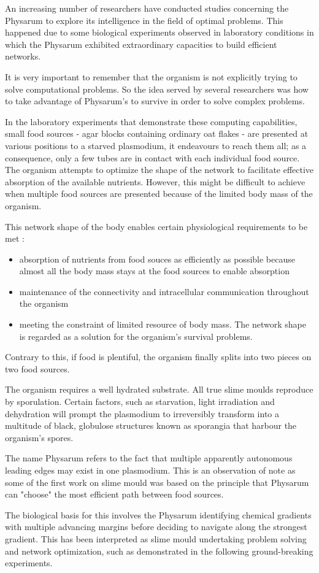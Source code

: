 
An increasing number of researchers have conducted studies concerning the Physarum to explore its intelligence in the field of optimal problems. This happened due to some biological experiments observed in laboratory conditions in which the Physarum exhibited extraordinary capacities to build efficient networks.
\par
It is very important to remember that the organism is not explicitly trying to solve computational problems. So the idea served by several researchers was how to take advantage of Physarum’s to survive in order to solve complex problems. 
\par
In the laboratory experiments that demonstrate these computing capabilities, small food sources - agar blocks containing ordinary oat flakes - are presented at various positions to a starved plasmodium, it endeavours to reach them all; as a consequence, only a few tubes are in contact with each individual food source.  The organism attempts to optimize the shape of the network to facilitate effective absorption of the available nutrients. However, this might be difficult to achieve when multiple food sources are presented because of the limited body mass of the organism.
\par
This network shape of the body enables certain physiological requirements to be met \cite{nakagaki2004obtaining}:
\begin{itemize}
	\item absorption of nutrients from food souces as efficiently as possible because almost all the body mass stays at the food sources to enable absorption
	\item maintenance of the connectivity and intracellular communication throughout the organism
	\item meeting the constraint of limited resource of body mass. The network shape is regarded as a solution for the
organism’s survival problems.
\end{itemize}

Contrary to this, if food is plentiful, the organism finally splits into two pieces on two food sources.

\par
The organism requires a well hydrated substrate. All true slime moulds reproduce by sporulation. Certain factors, such as starvation, light irradiation and dehydration will prompt the plasmodium to irreversibly transform into a multitude of black, globulose structures known as sporangia that harbour the organism’s spores.
\par
The name Physarum refers to the fact that multiple apparently autonomous leading edges may exist in one plasmodium. This is an observation of note as some of the first work on slime mould was based on the principle that Physarum can "choose" the most efficient path between food sources.
\par
The biological basis for this involves the Physarum identifying chemical gradients with multiple advancing margins before deciding to navigate along the strongest gradient. This has been interpreted as slime mould undertaking problem solving and network optimization, such as demonstrated in the following ground-breaking experiments.

